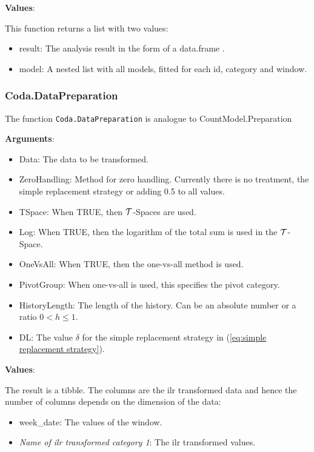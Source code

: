\textbf{Values}:

This function returns a list with two values:

\begin{itemize}
	\item result: The analysis result in the form of a data.frame . 
	\item model: A nested list with all models, fitted for each id, category and window.
\end{itemize}

\subsubsection{Coda.DataPreparation}
\label{sec:Coda.DataPreparation}

The function \texttt{Coda.DataPreparation} is analogue to CountModel.Preparation

\textbf{Arguments}:
\begin{itemize}
  \item Data: The data to be transformed.
  \item ZeroHandling: Method for zero handling.  Currently there is no treatment, the simple replacement strategy or adding 0.5 to all values. 
  \item TSpace: When TRUE, then $\mathcal{T}$-Spaces are used.
  \item Log: When TRUE, then the logarithm of the total sum is used in the $\mathcal{T}$-Space.
  \item OneVsAll: When TRUE, then the one-vs-all method is used.
  \item PivotGroup: When one-vs-all is used, this specifies the pivot category.
  \item HistoryLength: The length of the history. Can be an absolute number or a ratio $0<h\leq 1$.
	\item DL: The value $\delta$ for the simple replacement strategy in (\ref{eq:simple replacement strategy}). 
\end{itemize}

\textbf{Values}:

The result is a tibble. The columns are the ilr transformed data and hence the number of columns depends on the dimension of the data:

\begin{itemize}
	\item week\_date: The values of the window.
	\item \textit{Name of ilr transformed category 1}: The ilr transformed values.
\end{itemize}

